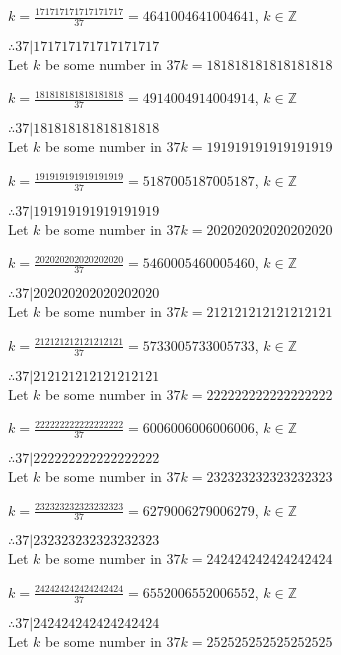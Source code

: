 \documentclass{article}
\begin{document}
$k = \frac{171717171717171717}{37} = 4641004641004641$, $k \in \mathbb{Z}$

$ \therefore  37|171717171717171717 $ \\

Let $k$ be some number in $37k = 181818181818181818$

$k = \frac{181818181818181818}{37} = 4914004914004914$, $k \in \mathbb{Z}$

$ \therefore  37|181818181818181818 $ \\

Let $k$ be some number in $37k = 191919191919191919$

$k = \frac{191919191919191919}{37} = 5187005187005187$, $k \in \mathbb{Z}$

$ \therefore  37|191919191919191919 $ \\

Let $k$ be some number in $37k = 202020202020202020$

$k = \frac{202020202020202020}{37} = 5460005460005460$, $k \in \mathbb{Z}$

$ \therefore  37|202020202020202020 $ \\

Let $k$ be some number in $37k = 212121212121212121$

$k = \frac{212121212121212121}{37} = 5733005733005733$, $k \in \mathbb{Z}$

$ \therefore  37|212121212121212121 $ \\

Let $k$ be some number in $37k = 222222222222222222$

$k = \frac{222222222222222222}{37} = 6006006006006006$, $k \in \mathbb{Z}$

$ \therefore  37|222222222222222222 $ \\

Let $k$ be some number in $37k = 232323232323232323$

$k = \frac{232323232323232323}{37} = 6279006279006279$, $k \in \mathbb{Z}$

$ \therefore  37|232323232323232323 $ \\

Let $k$ be some number in $37k = 242424242424242424$

$k = \frac{242424242424242424}{37} = 6552006552006552$, $k \in \mathbb{Z}$

$ \therefore  37|242424242424242424 $ \\

Let $k$ be some number in $37k = 252525252525252525$
\end{document}
